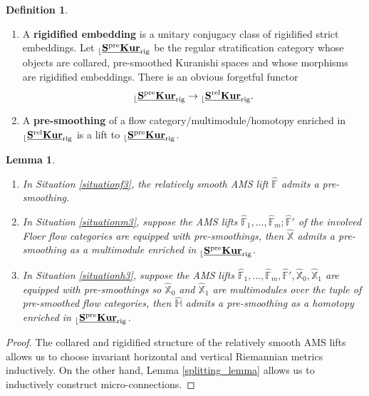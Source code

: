 \documentclass[reqno, 10pt]{amsart}
\numberwithin{equation}{section}
\numberwithin{equation}{section}
\newtheorem{lemma}[thm]{Lemma}
\theoremstyle{definition}
\newtheorem{defn}[thm]{Definition}
\theoremstyle{remark}
\newcommand{\beqn}{\begin{equation*}}
\newcommand{\eeqn}{\end{equation*}}
\newcommand{\mb}{\mathbb}
\renewcommand{\outer}{{}_{\lfloor}}
\newcommand{\uds}[1]{\underline{\smash{#1}}}
\begin{document}
\begin{defn}
\begin{enumerate}
\item A {\bf rigidified embedding} is a unitary conjugacy class of rigidified strict embeddings. Let $\outer \uds{\bf S^{\rm pre} Kur}_{\rm rig}$ be the regular stratification category whose objects are collared, pre-smoothed Kuranishi spaces and whose morphisms are rigidified embeddings. There is an obvious forgetful functor 
\beqn
\outer \uds{\bf S^{\rm pre} Kur}_{\rm rig} \to \outer \uds{\bf S^{\rm rel} Kur}_{\rm rig}.
\eeqn

\item A {\bf pre-smoothing} of a flow category/multimodule/homotopy enriched in $\outer \uds{\bf S^{\rm rel} Kur}_{\rm rig}$ is a lift to $\outer \uds{\bf S^{\rm pre} Kur}_{\rm rig}$.
\end{enumerate}
\end{defn}

\begin{lemma}\label{lemma_presmoothing}\hfill
\begin{enumerate}
    \item In Situation \ref{situationf3}, the relatively smooth AMS lift $\hat {\mb F}$ admits a pre-smoothing.

    \item In Situation \ref{situationm3}, suppose the AMS lifts $\hat {\mb F}_1 ,\ldots, \hat {\mb F}_m; \hat {\mb F}'$ of the involved Floer flow categories are equipped with pre-smoothings, then $\hat {\mb X}$ admits a pre-smoothing as a multimodule enriched in $\outer \uds{\bf S^{\rm pre} Kur}_{\rm rig}$.

    \item In Situation \ref{situationh3}, suppose the AMS lifts $\hat {\mb F}_1, \ldots, \hat {\mb F}_m, \hat {\mb F}', \hat {\mb X}_0, \hat {\mb X}_1$ are equipped with pre-smoothings so $\hat {\mb X}_0$ and $\hat {\mb X}_1$ are multimodules over the tuple of pre-smoothed flow categories, then $\hat {\mb H}$ admits a pre-smoothing as a homotopy enriched in $\outer \uds{\bf S^{\rm pre} Kur}_{\rm rig}$.
\end{enumerate}
\end{lemma}

\begin{proof}
The collared and rigidified structure of the relatively smooth AMS lifts allows us to choose invariant horizontal and vertical Riemannian metrics inductively. On the other hand, Lemma \ref{splitting_lemma} allows us to inductively construct micro-connections. 
\end{proof}
\end{document}
